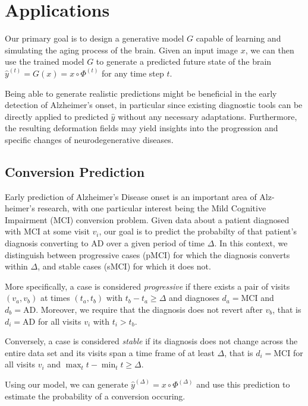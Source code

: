\chapter{Applications}
Our primary goal is to design a generative model $G$ capable of learning and simulating the aging process of the brain. Given an input image $x$, we can then use the trained model $G$ to generate a predicted future state of the brain $\hat y^{(t)} = G(x) = x \circ \Phi^{(t)}$ for any time step $t$.

Being able to generate realistic predictions might be beneficial in the early detection of Alzheimer's onset, in particular since existing diagnostic tools can be directly applied to predicted $\hat y$ without any necessary adaptations. Furthermore, the resulting deformation fields may yield insights into the progression and specific changes of neurodegenerative diseases.

\section{Conversion Prediction} \label{sec:appconvpred}
Early prediction of Alzheimer's Disease onset is an important area of Alz-heimer's research, with one particular interest being the Mild Cognitive Impairment (MCI) conversion problem. Given data about a patient diagnosed with MCI at some visit $v_i$, our goal is to predict the probabilty of that patient's diagnosis converting to AD over a given period of time $ \Delta $. 
In this context, we distinguish between progressive cases (pMCI) for which the diagnosis converts within $\Delta$, and stable cases (sMCI) for which it does not.

More specifically, a case is considered \textit{progressive} if there exists a pair of visits $(v_a, v_b)$ at times $(t_a, t_b)$ with $ t_b - t_a \geq \Delta $ and diagnoses $d_a = \text{MCI} $ and $d_b = \text{AD} $. Moreover, we require that the diagnosis does not revert after $v_b$, that is $ d_i = \text{AD} $ for all visits $v_i$ with $t_i > t_b$.

Conversely, a case is considered \textit{stable} if its diagnosis does not change across the entire data set and its visits span a time frame of at least $\Delta$, that is $ d_i = \text{MCI} $ for all visits $v_i$ and $ { \max_{t} t -  \min_{t} t \geq \Delta } $.

Using our model, we can generate $\hat y^{(\Delta)} = x \circ \Phi^{(\Delta)}$ and use this prediction to estimate the probability of a conversion occuring.

